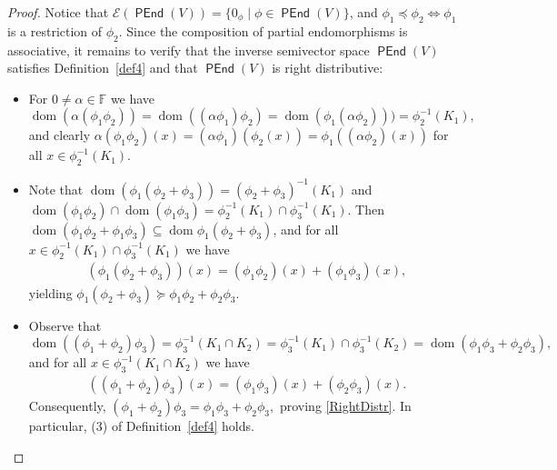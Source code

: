 \documentclass{amsart}
\newcommand{\E}{\mathcal{E}}
\newcommand{\0}{{\vartheta}}
\theoremstyle{definition}
\theoremstyle{remark}
\numberwithin{equation}{section}
\newtheorem*{Theorem A}{\textbf{Theorem A}}
\newtheorem*{Corollary E}{\textbf{Corollary E}}
\newtheorem*{Corollary F}{\textbf{Corollary F}}
\newtheorem*{Theorem B}{\textbf{Theorem B}}
\newtheorem*{Theorem C}{\textbf{Theorem C}}
\newtheorem*{Theorem D}{\textbf{Theorem B}}
\newtheorem*{p a}{\textbf{Proof of  Theorem A}}
\newtheorem*{p b}{\textbf{Proof of Theorem B}}
\newtheorem*{p c}{\textbf{Proof of  Theorem C}}
\newtheorem*{p d}{\textbf{Proof of  Theorem D}}
\DeclareMathOperator{\dom}{dom}
\DeclareMathOperator{\pen}{\textsf{PEnd}}
\begin{document}
\begin{proof}
Notice that $\E(\pen(V))=\{0_\phi\mid \phi\in \pen(V)\}$, and $\phi_1\preceq \phi_2\Longleftrightarrow \phi_1$ is a restriction of $\phi_2$. Since the composition of partial endomorphisms is associative, it remains to  verify that the inverse semivector space $\pen(V)$ satisfies Definition~\ref{def4} and that $\pen(V)$ is right distributive:
\begin{itemize}
\item[(1)] For  $ 0\neq \alpha \in \mathbb{F}$ we have $$\dom (\alpha (\phi_1 \phi_2))=\dom ((\alpha \phi_1)\phi_2)=\dom (\phi_1 (\alpha \phi_2)))=\phi_2^{-1}(K_1),$$
and clearly 
 $\alpha (\phi_1\phi_2)(x)=(\alpha \phi_1)(\phi_2 (x))=  \phi_1((\alpha \phi_2)(x))$ for all $x\in \phi_2^{-1}(K_1).$
\item[(2)] Note that $\dom(\phi_1 ( \phi_2+\phi_3))= (\phi_2+ \phi_3)^{-1} (K_1)$ and $ \dom
             (\phi_1\phi_2)\cap \dom ( \phi_1\phi_3)=
                          \phi_2^{-1}(K_1)\cap \phi_3^{-1}(K_1).$ Then $\dom (\phi_1\phi_2+ \phi_1  \phi_3 )\subseteq \dom\phi_1( \phi_2+\phi_3) $, and for all $x\in \phi_2^{-1}(K_1)\cap \phi_3^{-1}(K_1)$ we have 
  \begin{align*}
      ( \phi_1  (\phi_2+\phi_3))(x)=       
        (\phi_1 \phi_2)(x)+( \phi_1\phi_3) (x),     \end{align*}
yielding $\phi_1( \phi_2+\phi_3)\succeq \phi_1\phi_2+\phi_2  \phi_3.$
       \item[$(3)$] Observe that $$\dom (( \phi_1+\phi_2)\phi_3 )= \phi_3^{-1} (K_1\cap K_2)=\phi_3^{-1}(K_1)\cap\phi_3^{-1}(K_2)=\dom(\phi_1\phi_3+\phi_2\phi_3),$$ and for all $x\in\phi_3^{-1} (K_1\cap K_2)$ we have 
       \begin{align*}
      ((\phi_1+\phi_2)\phi_3)(x)=(\phi_1 \phi_3)(x)+( \phi_2\phi_3) (x).      
                \end{align*}
 Consequently, $ ( \phi_1+\phi_2)\phi_3= \phi_1\phi_3+\phi_2\phi_3,$ proving  \eqref{RightDistr}.  In particular, (3) of Definition~\ref{def4} holds. 



\end{itemize}
\end{proof}
\end{document}
